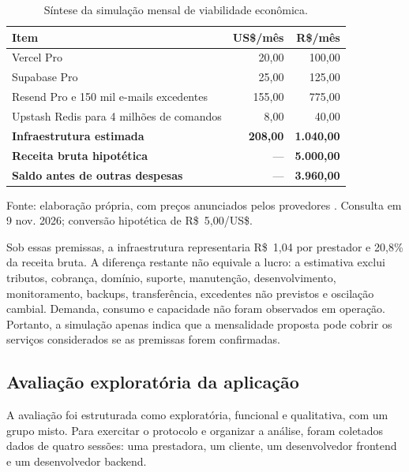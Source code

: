\begin{table}[htbp]
\centering
\caption{Síntese da simulação mensal de viabilidade econômica.}
\label{tab:viabilidade}
\small
\begin{tabularx}{\textwidth}{Y r r}
\toprule
\textbf{Item} & \textbf{US\$/mês} & \textbf{R\$/mês} \\
\midrule
Vercel Pro & 20,00 & 100,00 \\
Supabase Pro & 25,00 & 125,00 \\
Resend Pro e 150 mil e-mails excedentes & 155,00 & 775,00 \\
Upstash Redis para 4 milhões de comandos & 8,00 & 40,00 \\
\midrule
\textbf{Infraestrutura estimada} & \textbf{208,00} & \textbf{1.040,00} \\
\textbf{Receita bruta hipotética} & --- & \textbf{5.000,00} \\
\textbf{Saldo antes de outras despesas} & --- & \textbf{3.960,00} \\
\bottomrule
\end{tabularx}
\vspace{1mm}

{\footnotesize\raggedright Fonte: elaboração própria, com preços anunciados pelos provedores \cite{vercelpricing,supabasepricing,resendpricing,upstashpricing}. Consulta em 9 nov. 2026; conversão hipotética de R\$~5,00/US\$.\par}
\end{table}

Sob essas premissas, a infraestrutura representaria R\$~1,04 por prestador e 20,8\% da receita bruta. A diferença restante não equivale a lucro: a estimativa exclui tributos, cobrança, domínio, suporte, manutenção, desenvolvimento, monitoramento, backups, transferência, excedentes não previstos e oscilação cambial. Demanda, consumo e capacidade não foram observados em operação. Portanto, a simulação apenas indica que a mensalidade proposta pode cobrir os serviços considerados se as premissas forem confirmadas.


\subsection{Avaliação exploratória da aplicação}
\label{sec:avaliacao}

A avaliação foi estruturada como exploratória, funcional e qualitativa, com um grupo misto. Para exercitar o protocolo e organizar a análise, foram coletados dados de quatro sessões: uma prestadora, um cliente, um desenvolvedor frontend e um desenvolvedor backend.

